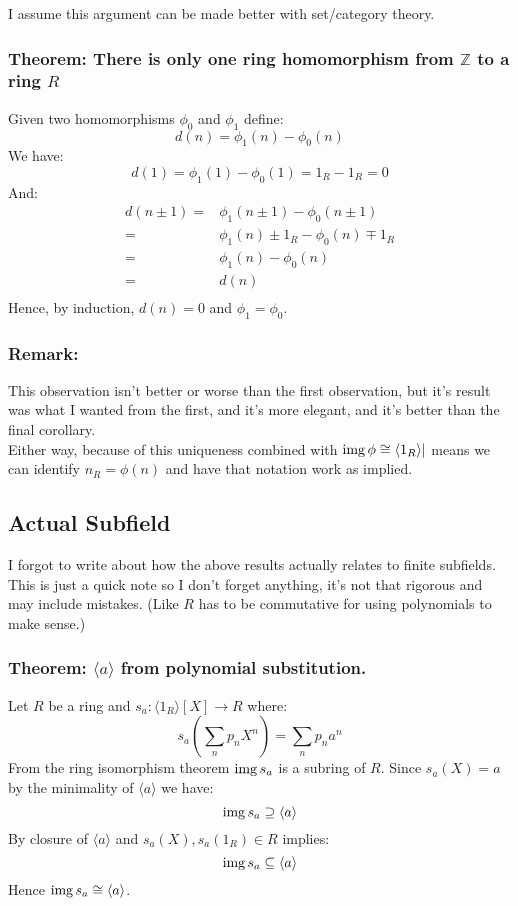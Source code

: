 I assume this argument can be made better with set/category theory.

\subsubsection{Theorem: There is only one ring homomorphism from $\mathbb{Z}$ to a ring $R$}
Given two homomorphisms $\phi_0$ and $\phi_1$ define:
\[d(n) = \phi_1(n)-\phi_0(n)\]
We have:
\[d(1) = \phi_1(1)-\phi_0(1) = 1_R-1_R = 0\]
And:
\begin{equation*}
\begin{aligned}
	d(n\pm1) =& \phi_1(n\pm1) - \phi_0(n\pm1) \\
	=& \phi_1(n) \pm 1_R - \phi_0(n) \mp 1_R \\
	=& \phi_1(n) - \phi_0(n) \\
	=&d(n)\\
\end{aligned}
\end{equation*}
Hence,
by induction,
$d(n)=0$ and $\phi_1 = \phi_0$.

\subsubsection{Remark:}
This observation isn't better or worse than the first observation,
but it's result was what I wanted from the first,
and it's more elegant,
and it's better than the final corollary.
\\

Either way, because of this uniqueness combined with $\operatorname{img}\phi\cong\langle 1_R \rangle|$ means we can identify $n_R = \phi(n)$ and have that notation work as implied.

\subsection{Actual Subfield}
I forgot to write about how the above results actually relates to finite subfields.
This is just a quick note so I don't forget anything, it's not that rigorous and may include mistakes.
(Like $R$ has to be commutative for using polynomials to make sense.)

\subsubsection{Theorem: $\langle a \rangle$ from polynomial substitution.}
Let $R$ be a ring and $s_a: \langle 1_R \rangle[X] \rightarrow R$ where:
\[s_a\left(\sum_np_nX^n\right) = \sum_np_na^n\]
From the ring isomorphism theorem $\operatorname{img} s_a$ is a subring of $R$.
Since $s_a(X)=a$ by the minimality of $\langle a \rangle$ we have:
\[\operatorname{img} s_a \supseteq \langle a \rangle\] 
By closure of $\langle a \rangle$ and $s_a(X),s_a(1_R)\in R$ implies:
\[\operatorname{img} s_a \subseteq \langle a \rangle\] 
Hence $\operatorname{img} s_a\cong\langle a \rangle$.

